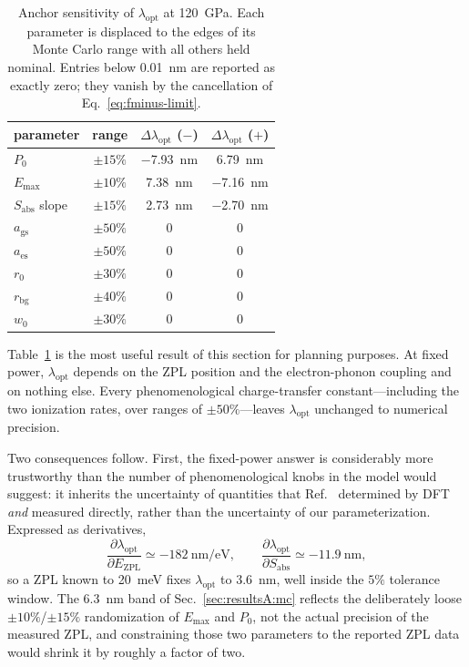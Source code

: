 \documentclass[preprint,12pt]{elsarticle}
\newcommand{\lopt}{\ensuremath{\lambda_{\mathrm{opt}}}}
\begin{document}
\begin{table}[t]
  \centering
  \caption{Anchor sensitivity of $\lopt$ at \SI{120}{\giga\pascal}. Each
  parameter is displaced to the edges of its Monte Carlo range with all others
  held nominal. Entries below \SI{0.01}{\nano\meter} are reported as exactly
  zero; they vanish by the cancellation of Eq.~\eqref{eq:fminus-limit}.}
  \label{tab:tornado}
  \begin{tabular}{lccc}
    \toprule
    parameter & range & $\Delta\lopt$ ($-$) & $\Delta\lopt$ ($+$) \\
    \midrule
    $P_0$              & $\pm 15\%$ & \SI{-7.93}{\nano\meter} & \SI{+6.79}{\nano\meter} \\
    $E_{\max}$         & $\pm 10\%$ & \SI{+7.38}{\nano\meter} & \SI{-7.16}{\nano\meter} \\
    $S_{\mathrm{abs}}$ slope & $\pm 15\%$ & \SI{+2.73}{\nano\meter} & \SI{-2.70}{\nano\meter} \\
    \midrule
    $a_{\mathrm{gs}}$  & $\pm 50\%$ & $0$ & $0$ \\
    $a_{\mathrm{es}}$  & $\pm 50\%$ & $0$ & $0$ \\
    $r_0$              & $\pm 30\%$ & $0$ & $0$ \\
    $r_{\mathrm{bg}}$  & $\pm 40\%$ & $0$ & $0$ \\
    $w_0$              & $\pm 30\%$ & $0$ & $0$ \\
    \bottomrule
  \end{tabular}
\end{table}

Table~\ref{tab:tornado} is the most useful result of this section for planning
purposes. At fixed power, $\lopt$ depends on the ZPL position and the
electron-phonon coupling and on nothing else. Every phenomenological
charge-transfer constant---including the two ionization rates, over ranges of
$\pm 50\%$---leaves $\lopt$ unchanged to numerical precision.

Two consequences follow. First, the fixed-power answer is considerably more
trustworthy than the number of phenomenological knobs in the model would suggest:
it inherits the uncertainty of quantities that Ref.~\cite{Ho2026} determined by
DFT \emph{and} measured directly, rather than the uncertainty of our
parameterization. Expressed as derivatives,
\begin{equation}
  \frac{\partial \lopt}{\partial E_{\mathrm{ZPL}}} \simeq
  \SI{-182}{\nano\meter\per\electronvolt},
  \qquad
  \frac{\partial \lopt}{\partial S_{\mathrm{abs}}} \simeq
  \SI{-11.9}{\nano\meter},
\end{equation}
so a ZPL known to \SI{20}{\milli\electronvolt} fixes $\lopt$ to
\SI{3.6}{\nano\meter}, well inside the $5\%$ tolerance window. The
\SI{6.3}{\nano\meter} band of Sec.~\ref{sec:resultsA:mc} reflects the
deliberately loose $\pm 10\%$/$\pm 15\%$ randomization of $E_{\max}$ and $P_0$,
not the actual precision of the measured ZPL, and constraining those two
parameters to the reported ZPL data would shrink it by roughly a factor of two.
\end{document}
